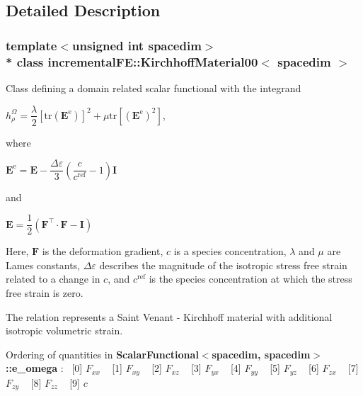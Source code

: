 \subsection{Detailed Description}
\subsubsection*{template$<$unsigned int spacedim$>$\\*
class incremental\+F\+E\+::\+Kirchhoff\+Material00$<$ spacedim $>$}

Class defining a domain related scalar functional with the integrand

$h^\Omega_\rho = \dfrac{\lambda}{2} \left[\mathrm{tr}\left(\boldsymbol{E}^\mathrm{e}\right)\right]^2 + \mu\mathrm{tr}\left[\left(\boldsymbol{E}^\mathrm{e}\right)^2\right]$,

where

$ \boldsymbol{E}^\mathrm{e} = \boldsymbol{E} - \dfrac{\Delta \varepsilon}{3} \left( \dfrac{c}{c^{\mathrm{ref}}} - 1 \right) \mathbf{I} $

and

$ \boldsymbol{E} = \dfrac{1}{2} ( \boldsymbol{F}^\top \cdot \boldsymbol{F} - \boldsymbol{I} ) $

Here, $\boldsymbol{F}$ is the deformation gradient, $c$ is a species concentration, $\lambda$ and $\mu$ are Lame\textquotesingle{}s constants, $\Delta \varepsilon$ describes the magnitude of the isotropic stress free strain related to a change in $c$, and $c^{\mathrm{ref}}$ is the species concentration at which the stress free strain is zero.

The relation represents a Saint Venant -\/ Kirchhoff material with additional isotropic volumetric strain.

Ordering of quantities in {\bf Scalar\+Functional$<$spacedim, spacedim$>$\+::e\+\_\+omega} \+:~\newline
 \mbox{[}0\mbox{]} $F_{xx}$ ~\newline
 \mbox{[}1\mbox{]} $F_{xy}$ ~\newline
 \mbox{[}2\mbox{]} $F_{xz}$ ~\newline
 \mbox{[}3\mbox{]} $F_{yx}$ ~\newline
 \mbox{[}4\mbox{]} $F_{yy}$ ~\newline
 \mbox{[}5\mbox{]} $F_{yz}$ ~\newline
 \mbox{[}6\mbox{]} $F_{zx}$ ~\newline
 \mbox{[}7\mbox{]} $F_{zy}$ ~\newline
 \mbox{[}8\mbox{]} $F_{zz}$ ~\newline
 \mbox{[}9\mbox{]} $c$ 

